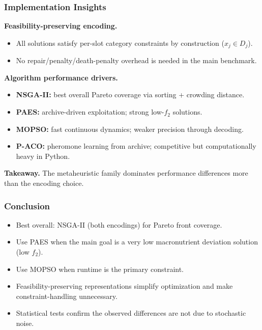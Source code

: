 \documentclass[aspectratio=169,10pt]{beamer}
\begin{document}
\begin{frame}
\frametitle{Implementation Insights}

\textbf{Feasibility-preserving encoding.}
\begin{itemize}
  \item All solutions satisfy per-slot category constraints by construction ($x_j\in D_j$).
  \item No repair/penalty/death-penalty overhead is needed in the main benchmark.
\end{itemize}

\vspace{0.25cm}

\textbf{Algorithm performance drivers.}
\begin{itemize}
  \item \textbf{NSGA-II:} best overall Pareto coverage via sorting + crowding distance.
  \item \textbf{PAES:} archive-driven exploitation; strong low-$f_2$ solutions.
  \item \textbf{MOPSO:} fast continuous dynamics; weaker precision through decoding.
  \item \textbf{P-ACO:} pheromone learning from archive; competitive but computationally heavy in Python.
\end{itemize}

\vspace{0.25cm}

\textbf{Takeaway.} The metaheuristic family dominates performance differences more than the encoding choice.

\end{frame}

\begin{frame}
\frametitle{Conclusion}

\begin{itemize}
  \item Best overall: NSGA-II (both encodings) for Pareto front coverage.
  \item Use PAES when the main goal is a very low macronutrient deviation solution (low $f_2$).
  \item Use MOPSO when runtime is the primary constraint.
  \item Feasibility-preserving representations simplify optimization and make constraint-handling unnecessary.
  \item Statistical tests confirm the observed differences are not due to stochastic noise.
\end{itemize}

\end{frame}
\end{document}
